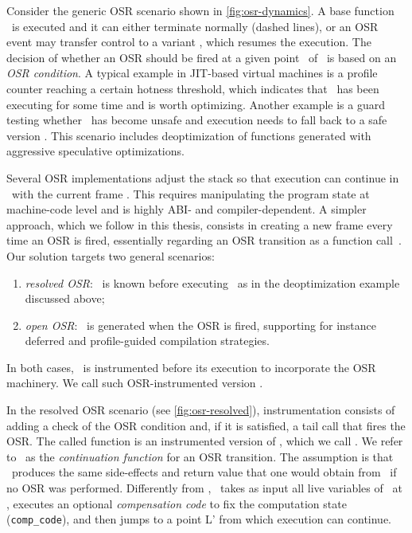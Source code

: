 \noindent Consider the generic OSR scenario shown in \myfigure\ref{fig:osr-dynamics}. A base function \fbase\ is executed and it can either terminate normally (dashed lines), or an OSR event may transfer control to a variant \fvariant, which resumes the execution. The decision of whether an OSR should be fired at a given point \osrpoint\ of \fbase\ is based on an {\em OSR condition}. A typical example in JIT-based virtual machines is a profile counter reaching a certain hotness threshold, which indicates that \fbase\ has been executing for some time and is worth optimizing. Another example is a guard testing whether \fbase\ has become unsafe and execution needs to fall back to a safe version \fvariant. This scenario includes deoptimization of functions generated with aggressive speculative optimizations.

Several OSR implementations adjust the stack so that execution can continue in \fvariant\ with the current frame \cite{Chambers91, Chambers92, Holzle92, Suganuma06}. This requires manipulating the program state at machine-code level and is highly ABI- and compiler-dependent. A simpler approach, which we follow in this thesis, consists in creating a new frame every time an OSR is fired, essentially regarding an OSR transition as a function call~\cite{Lameed13,Pizlo14}. Our solution targets two general scenarios:
\begin{enumerate}[parsep=0pt]
 \item {\em resolved OSR}: \fvariant\ is known before executing \fbase\ as in the deoptimization example discussed above;
 \item {\em open OSR}: \fvariant\ is generated when the OSR is fired, supporting for instance deferred and profile-guided compilation strategies.
\end{enumerate}

\noindent In both cases, \fbase\ is instrumented before its execution to incorporate the OSR machinery. We call such OSR-instrumented version \fosrfrom.

In the resolved OSR scenario (see \myfigure\ref{fig:osr-resolved}), instrumentation consists of adding a check of the OSR condition and, if it is satisfied, a tail call that fires the OSR. The called function is an instrumented version of \fvariant, which we call \fosrto. We refer to \fosrto\ as the {\em continuation function} for an OSR transition. The assumption is that \fosrto\ produces the same side-effects and return value that one would obtain from \fbase\ if no OSR was performed. Differently from \fvariant, \fosrto\ takes as input all live variables of \fbase\ at \osrpoint, executes an optional {\em compensation code} to fix the computation state ({\tt comp\_code}), and then jumps to a point \textsf{L'} from which execution can continue.

